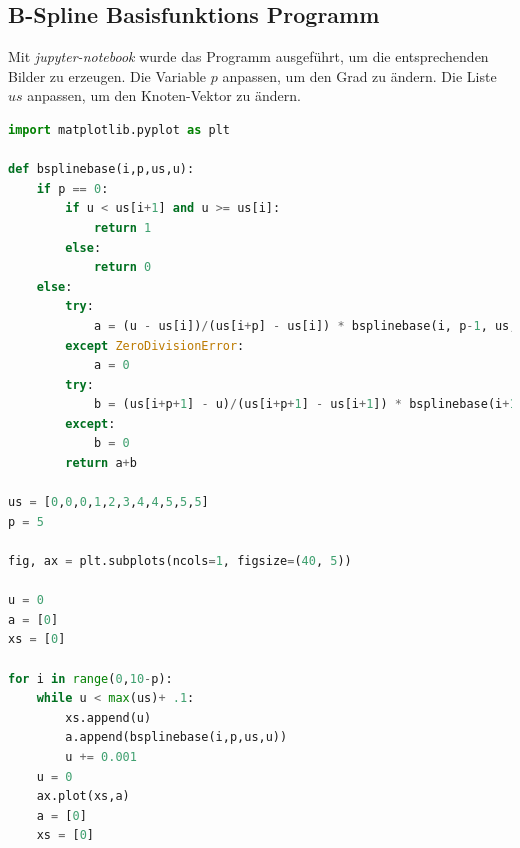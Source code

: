 \documentclass[11pt]{article}
\begin{document}
\subsection*{B-Spline Basisfunktions Programm}

Mit \emph{jupyter-notebook} wurde das Programm ausgeführt, um die entsprechenden Bilder zu erzeugen. 
Die Variable $p$ anpassen, um den Grad zu ändern.
Die Liste $us$ anpassen, um den Knoten-Vektor zu ändern.

\begin{lstlisting}[caption=B-Splines Basisfunktionen, label=bsplineprogramm, language=Python]
import matplotlib.pyplot as plt

def bsplinebase(i,p,us,u):
    if p == 0:
        if u < us[i+1] and u >= us[i]:
            return 1
        else:
            return 0
    else:
        try:
            a = (u - us[i])/(us[i+p] - us[i]) * bsplinebase(i, p-1, us, u)
        except ZeroDivisionError:
            a = 0
        try:
            b = (us[i+p+1] - u)/(us[i+p+1] - us[i+1]) * bsplinebase(i+1, p-1, us, u)
        except:
            b = 0
        return a+b

us = [0,0,0,1,2,3,4,4,5,5,5]
p = 5

fig, ax = plt.subplots(ncols=1, figsize=(40, 5))

u = 0
a = [0]
xs = [0]

for i in range(0,10-p):
    while u < max(us)+ .1:
        xs.append(u)
        a.append(bsplinebase(i,p,us,u))
        u += 0.001
    u = 0
    ax.plot(xs,a)
    a = [0]
    xs = [0]
\end{lstlisting}
\end{document}
